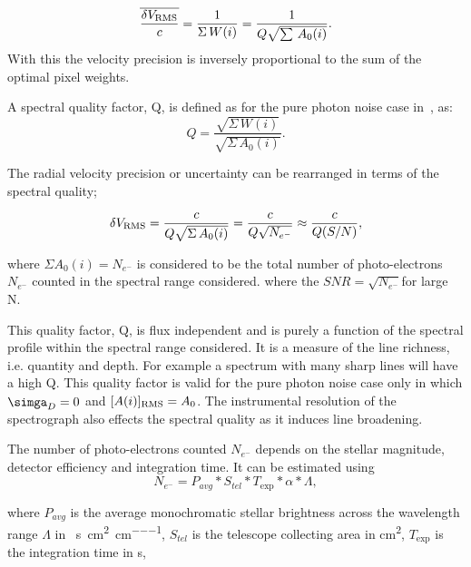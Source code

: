\begin{equation}
    \overline{\frac{\delta V_{\textrm{RMS}}}{c}} = \frac{1}{\Sigma {\,W(i)}} = \frac{1}{Q \sqrt{\sum{\,A_0(i)}}}. \label{eq:dv_rms}
\end{equation}
With this the velocity precision is inversely proportional to the sum of the optimal pixel weights.

A spectral quality factor, Q, is defined as for the pure photon noise case in~\cite{connes_absolute_1985, connes_demonstration_1996}, as:
\begin{equation}
Q = \frac{\sqrt{\Sigma{\,W(i)}}}{\sqrt{\Sigma{\,A_0(i)}}}.
\end{equation}

The radial velocity precision or uncertainty can be rearranged in terms of the spectral quality;

\begin{equation}
    \delta V_{\textrm{RMS}} = \frac{c}{Q \sqrt{\Sigma {\,A_0(i)}}} = \frac{c}{Q \sqrt{{N}_{{e}^{-}}}} \approx \frac{c}{Q (S/N)},
\end{equation}

where \(\Sigma A_0(i) = {N}_{{e}^{-}}\) is considered to be the total number of photo-electrons \({N}_{{e}^{-}}\) counted in the spectral range considered.
where the \({SNR}=\sqrt{N_{e^-}}\)for large N. 


This quality factor, Q, is flux independent and is purely a function of the spectral profile within the spectral range considered. It is a measure of the line richness, i.e. quantity and depth. For example a spectrum with many sharp lines will have a high Q. This quality factor is valid for the pure photon noise case only in which \(\simga_{D} =0\) and \([A(i)]_{\textrm{RMS}} = A_0\). The instrumental resolution of the spectrograph also effects the spectral quality as it induces line broadening.

The number of photo-electrons counted \(N_{e^{-}}\) depends on the stellar magnitude, detector efficiency and integration time. It can be estimated using
 \begin{equation}
 N_{e^{-}} = P_{avg} * S_{tel} * T_{\textrm{exp}} * \alpha* \Lambda,
 \end{equation}

where \(P_{avg}\) is the average monochromatic stellar brightness
across the wavelength range \(\Lambda\) in \si{\photons\per\second\per\centi\metre\squared\per\centi\metre},
\(S_{tel}\) is the telescope collecting area in \si{\centi\metre\squared},
\(T_{\textrm{exp}}\) is the integration time in \si{\second},

